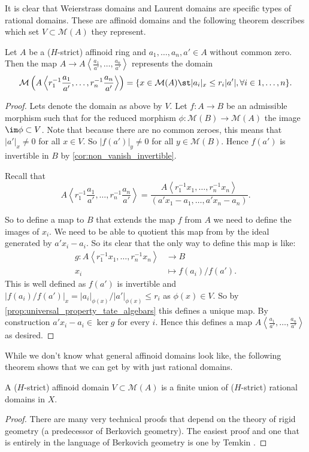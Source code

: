 It is clear that Weierstrass domains and Laurent domains are specific types of rational domains. 
These are affinoid domains and the following theorem describes which set $V \subset \mathcal{M} (A)$ they represent. 
\begin{proposition}
	Let $A$ be a ($H$-strict) affinoid ring and $a_1, \ldots, a_n, a' \in A$ without common zero.
	Then the map $A \to A\left<\frac{a_1}{a'}, \ldots, \frac{a_n}{a'} \right>$ represents the domain \[
		\mathcal{M} \left(A \left<r^{-1}_1\frac{a_1}{a'}, \ldots, r^{-1}_n\frac{a_n}{a'}\right> \right) = \{x \in \mathcal{M} (A) \st |a_i|_x \le r_i|a'|, \forall i \in 1, \ldots, n\} 
	.\] 
\end{proposition}
\begin{proof}
	Lets denote the domain as above by $V$. 
	Let $f:A \to B$ be an admissible morphism such that for the reduced morphism $\phi: \mathcal{M} (B) \to \mathcal{M} (A)$ the image $\im \phi \subset  V$.
	Note that because there are no common zeroes, this means that $|a'|_x \ne 0$ for all $x \in V$. 
	So $|f(a')|_{y} \ne 0$ for all $y \in \mathcal{M} (B)$. 
	Hence $f(a')$ is invertible in $B$ by \cref{cor:non_vanish_invertible}. 

	Recall that \[
	A\left<r^{-1}_1\frac{a_1}{a'}, \ldots, r_n^{-1}\frac{a_n}{a'} \right> = \frac{A\left<r_1^{-1}x_1, \ldots, r_n^{-1}x_n \right>}{(a' x_1 - a_1, \ldots, a' x_n - a_n)}
	.\] 

	So to define a map to $B$ that extends the map $f$ from $A$ we need to define the images of $x_i$. 
	We need to be able to quotient this map from by the ideal generated by $a'x_i - a_i$. 
	So its clear that the only way to define this map is like:
	\begin{align*}
		g: A\left<r_1^{-1}x_1, \ldots, r_n^{-1}x_n \right> &\longrightarrow B \\
		x_i &\longmapsto f(a_i) / f(a')
	.\end{align*}
	This is well defined as $f(a')$ is invertible and $|f(a_i) / f(a')|_x = |a_i|_{\phi(x)} / |a'|_{\phi(x)} \le r_i$ as $\phi(x) \in V$. 
	So by \cref{prop:universal_property_tate_algebars} this defines a unique map. 
	By construction $a'x_i - a_i \in \ker g$ for every $i$. Hence this defines a map $A \left<\frac{a_1}{a'}, \ldots, \frac{a_n}{a'} \right>$ as desired. 
\end{proof}

While we don't know what general affinoid domains look like, the following theorem shows that we can get by with just rational domains. 
\begin{proposition}
	A ($H$-strict) affinoid domain $V \subset  \mathcal{M} (A)$ is a finite union of ($H$-strict) rational domains in $X$.
\end{proposition}
\begin{proof}
	There are many very technical proofs that depend on the theory of rigid geometry (a predecessor of Berkovich geometry).
	The easiest proof and one that is entirely in the language of Berkovich geometry is one by Temkin \cite{temkinNewProofGerritzenGrauert2005}.
\end{proof}




